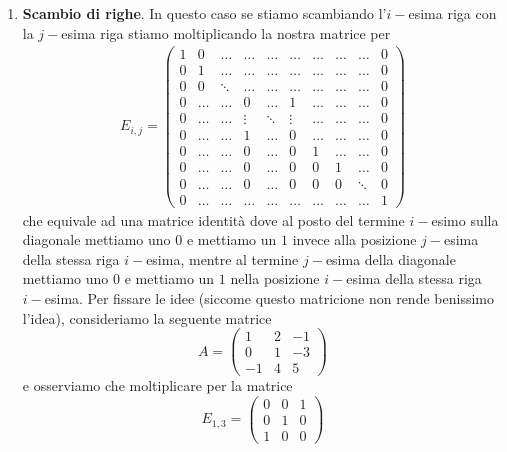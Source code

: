 \begin{enumerate}
  \item \textbf{Scambio di righe}. In questo caso se stiamo scambiando l'$i-$esima riga con la $j-$esima riga stiamo moltiplicando la nostra matrice per
  \begin{align}
    E_{i,j} = \begin{pmatrix}
      1 & 0 & \ldots & \ldots & \ldots & \ldots & \ldots & \ldots & \ldots & 0 \\
      0 & 1 & \ldots & \ldots & \ldots & \ldots & \ldots & \ldots & \ldots & 0 \\
      0 & 0 & \ddots & \ldots & \ldots & \ldots & \ldots & \ldots & \ldots & 0 \\
      0 & \ldots & \ldots & 0 & \ldots & 1 & \ldots & \ldots & \ldots & 0 \\
      0 & \ldots & \ldots & \vdots & \ddots & \vdots & \ldots & \ldots & \ldots & 0 \\
      0 & \ldots & \ldots & 1 & \ldots & 0 & \ldots & \ldots & \ldots & 0 \\
      0 & \ldots & \ldots & 0 & \ldots & 0 & 1 & \ldots & \ldots & 0 \\
      0 & \ldots & \ldots & 0 & \ldots & 0 & 0 & 1 & \ldots & 0 \\
      0 & \ldots & \ldots & 0 & \ldots & 0 & 0 & 0 & \ddots & 0 \\
      0 & \ldots & \ldots & \ldots & \ldots & \ldots & \ldots & \ldots & \ldots & 1
    \end{pmatrix}
  \end{align}
  che equivale ad una matrice identità dove al posto del termine $i-$esimo sulla diagonale mettiamo uno $0$ e mettiamo un $1$ invece alla posizione $j-$esima della stessa riga $i-$esima, mentre al termine $j-$esima della diagonale mettiamo uno $0$ e mettiamo un $1$ nella posizione $i-$esima della stessa riga $i-$esima. Per fissare le idee (siccome questo matricione non rende benissimo l'idea), consideriamo la seguente matrice
  $$
    A = \begin{pmatrix}
      1 & 2 & -1 \\
      0 & 1 & -3 \\
      -1 & 4 & 5 
    \end{pmatrix}
  $$
  e osserviamo che moltiplicare per la matrice
  $$
    E_{1, 3} = \begin{pmatrix}
      0 & 0 & 1 \\
      0 & 1 & 0 \\
      1 & 0 & 0
    \end{pmatrix}
$$
\end{enumerate}
